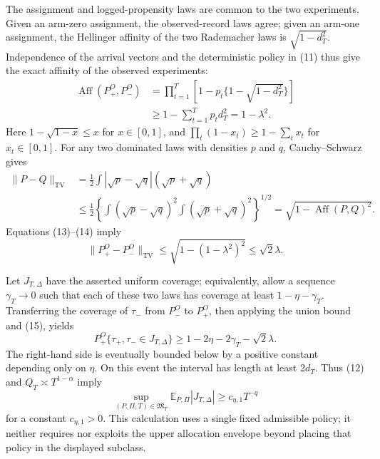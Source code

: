 The assignment and logged-propensity laws are common to the two experiments.  Given an arm-zero assignment, the observed-record laws agree; given an arm-one assignment, the Hellinger affinity of the two Rademacher laws is \(\sqrt{1-d_T^2}\).  Independence of the arrival vectors and the deterministic policy in (11) thus give the exact affinity of the observed experiments:
\[
 \begin{aligned}
 \operatorname{Aff}(P_+^O,P_-^O)
 &=\prod_{t=1}^T
   \left[1-p_t\{1-\sqrt{1-d_T^2}\}\right]\\
 &\geq1-\sum_{t=1}^T p_td_T^2
 =1-\lambda^2. 
 \end{aligned} \tag{13}
\]
Here \(1-\sqrt{1-x}\leq x\) for \(x\in[0,1]\), and
\(
\prod_t(1-x_t)\geq1-\sum_t x_t
\)
for \(x_t\in[0,1]\).  For any two dominated laws with densities \(p\) and \(q\), Cauchy--Schwarz gives
\[
 \begin{aligned}
 \|P-Q\|_{\mathrm{TV}}
 &=\frac12\int|\sqrt p-\sqrt q|(\sqrt p+\sqrt q)\\
 &\leq\frac12
 \left\{\int(\sqrt p-\sqrt q)^2
       \int(\sqrt p+\sqrt q)^2\right\}^{1/2}
 =\sqrt{1-\operatorname{Aff}(P,Q)^2}.
 \end{aligned} \tag{14}
\]
Equations (13)--(14) imply
\[
 \|P_+^O-P_-^O\|_{\mathrm{TV}}
 \leq\sqrt{1-(1-\lambda^2)^2}
 \leq\sqrt2\lambda. \tag{15}
\]

Let \(J_{T,\Delta}\) have the asserted uniform coverage; equivalently, allow a sequence \(\gamma_T\to0\) such that each of these two laws has coverage at least \(1-\eta-\gamma_T\).  Transferring the coverage of \(\tau_-\) from \(P_-^O\) to \(P_+^O\), then applying the union bound and (15), yields
\[
 P_+^O\{\tau_+,\tau_-\in J_{T,\Delta}\}
 \geq1-2\eta-2\gamma_T-\sqrt2\lambda. \tag{16}
\]
The right-hand side is eventually bounded below by a positive constant depending only on \(\eta\).  On this event the interval has length at least \(2d_T\).  Thus (12) and \(Q_T\asymp T^{1-\alpha}\) imply
\[
 \sup_{(P,\Pi,T)\in\mathfrak M_T}
 \mathbb E_{P,\Pi}|J_{T,\Delta}|
 \geq c_{\eta,1}T^{-q} \tag{17}
\]
for a constant \(c_{\eta,1}>0\).  This calculation uses a single fixed admissible policy; it neither requires nor exploits the upper allocation envelope beyond placing that policy in the displayed subclass.

